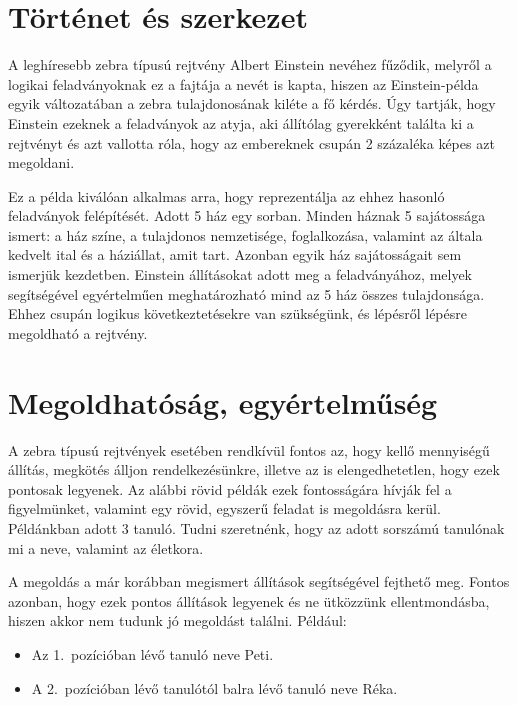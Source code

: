\documentclass[12pt,a4paper,oneside]{report}
\begin{document}
    \section{Történet és szerkezet} %

A leghíresebb zebra típusú rejtvény Albert Einstein nevéhez fűződik, melyről a logikai feladványoknak ez a fajtája a nevét is kapta, hiszen az Einstein-példa egyik változatában a zebra tulajdonosának kiléte a fő kérdés. 
Úgy tartják, hogy Einstein ezeknek a feladványok az atyja, aki állítólag gyerekként találta ki a rejtvényt és azt vallotta róla, hogy az embereknek csupán 2 százaléka képes azt megoldani.

Ez a példa kiválóan alkalmas arra, hogy reprezentálja az ehhez hasonló feladványok felépítését.
Adott 5 ház egy sorban. Minden háznak 5 sajátossága ismert: a ház színe, a tulajdonos nemzetisége, foglalkozása, valamint az általa kedvelt ital és a háziállat, amit tart. 
Azonban egyik ház sajátosságait sem ismerjük kezdetben. 
Einstein állításokat adott meg a feladványához, melyek segítségével egyértelműen meghatározható mind az 5 ház összes tulajdonsága. 
Ehhez csupán logikus következtetésekre van szükségünk, és lépésről lépésre megoldható a rejtvény.



    \section{Megoldhatóság, egyértelműség} %

A zebra típusú rejtvények esetében rendkívül fontos az, hogy kellő mennyiségű állítás, megkötés álljon rendelkezésünkre, illetve az is elengedhetetlen, hogy ezek pontosak legyenek. 
Az alábbi rövid példák ezek fontosságára hívják fel a figyelmünket, valamint egy rövid, egyszerű feladat is megoldásra kerül.
Példánkban adott 3 tanuló. 
Tudni szeretnénk, hogy az adott sorszámú tanulónak mi a neve, valamint az életkora.

A megoldás a már korábban megismert állítások segítségével fejthető meg. 
Fontos azonban, hogy ezek pontos állítások legyenek és ne ütközzünk ellentmondásba, hiszen akkor nem tudunk jó megoldást találni. 
Például:
\begin{itemize}
\item Az 1.\ pozícióban lévő tanuló neve Peti.
\item A 2.\ pozícióban lévő tanulótól balra lévő tanuló neve Réka.
\end{itemize}
\end{document}

